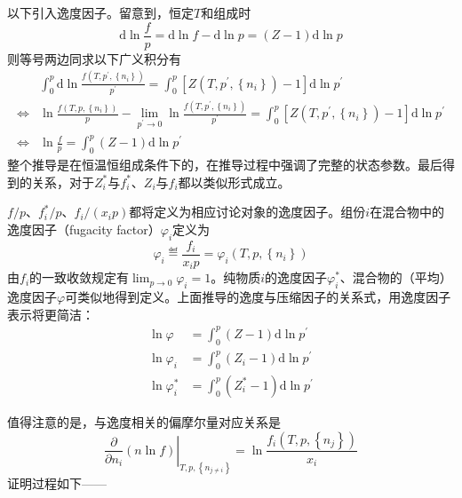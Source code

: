\documentclass[main.tex]{subfiles}
\begin{document}
以下引入逸度因子。留意到，恒定$T$和组成时
\[\mathrm{d}\ln\frac{f}{p}=\mathrm{d}\ln f-\mathrm{d}\ln p=\left(Z-1\right)\mathrm{d}\ln p\]
则等号两边同求以下广义积分有
\begin{align*}
                    & \int_0^p\mathrm{d}\ln\frac{f\left(T,p^\prime,\left\{n_i\right\}\right)}{p^\prime}=\int_0^p\left[Z\left(T,p^\prime,\left\{n_i\right\}\right)-1\right]\mathrm{d}\ln p^\prime                                                     \\
    \Leftrightarrow & \ln\frac{f\left(T,p,\left\{n_i\right\}\right)}{p}-\lim_{p^\prime\to 0}\ln\frac{f\left(T,p^\prime,\left\{n_i\right\}\right)}{p^\prime}=\int_0^p\left[Z\left(T,p^\prime,\left\{n_i\right\}\right)-1\right]\mathrm{d}\ln p^\prime \\
    \Leftrightarrow & \ln\frac{f}{p}=\int_0^p\left(Z-1\right)\mathrm{d}\ln p^\prime
\end{align*}
整个推导是在恒温恒组成条件下的，在推导过程中强调了完整的状态参数。最后得到的关系，对于$Z_i^*$与$f_i^*$、$Z_i$与$f_i$都以类似形式成立。

$f/p$、$f_i^*/p$、$f_i/\left(x_ip\right)$都将定义为相应讨论对象的逸度因子。组份$i$在混合物中的逸度因子（fugacity factor）$\varphi_i$定义为
\begin{equation}\label{eq:II.4_def_fugacity_factor_i}
    \varphi_i\eqdef\frac{f_i}{x_ip}=\varphi_i\left(T,p,\left\{n_i\right\}\right)
\end{equation}
由$f_i$的一致收敛规定有$\lim_{p\to 0}\varphi_i=1$。纯物质$i$的逸度因子$\varphi_i^*$、混合物的（平均）逸度因子$\varphi$可类似地得到定义。上面推导的逸度与压缩因子的关系式，用逸度因子表示将更简洁：
\begin{align*}
    \ln\varphi     & =\int_0^p\left(Z-1\right)\mathrm{d}\ln p^\prime     \\
    \ln\varphi_i   & =\int_0^p\left(Z_i-1\right)\mathrm{d}\ln p^\prime   \\
    \ln\varphi^*_i & =\int_0^p\left(Z_i^*-1\right)\mathrm{d}\ln p^\prime
\end{align*}

值得注意的是，与逸度相关的偏摩尔量对应关系是
\[\left.\frac{\partial}{\partial n_i}\left(n\ln f\right)\right|_{T,p,\left\{n_{j\neq i}\right\}}=\ln\frac{f_i\left(T,p,\left\{n_j\right\}\right)}{x_i}\]
证明过程如下——
\end{document}
